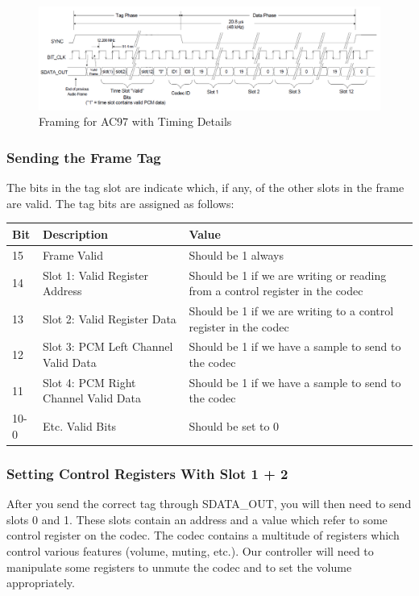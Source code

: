 \documentclass[11pt]{article}
\begin{document}
\begin{figure}[hbt]
	\begin{center}
		\includegraphics[width=6in]{ac97_framing_detail}
		\caption{Framing for AC97 with Timing Details}
	\end{center}
\end{figure}

\subsubsection{Sending the Frame Tag}

The bits in the tag slot are indicate which, if any, of the other slots in the frame are valid. The tag bits are assigned as follows:

\renewcommand{\arraystretch}{1.5}
\begin{center}
	\begin{tabular}{ | l | l | p{8cm} |}
		\hline
		Bit & Description & Value \\ \hline
		15 & Frame Valid & Should be 1 always  \\ \hline
		14 & Slot 1: Valid Register Address & Should be 1 if we are writing or reading from a control register in the codec  \\ \hline
		13 & Slot 2: Valid Register Data & Should be 1 if we are writing to a control register in the codec \\ \hline
		12 & Slot 3: PCM Left Channel Valid Data & Should be 1 if we have a sample to send to the codec  \\ \hline
		11 & Slot 4: PCM Right Channel Valid Data & Should be 1 if we have a sample to send to the codec  \\ \hline
		10-0 & Etc. Valid Bits & Should be set to 0 \\ \hline		
	\end{tabular}
\end{center}

\subsubsection{Setting Control Registers With Slot 1 + 2}
After you send the correct tag through SDATA\_OUT, you will then need to send slots 0 and 1. These slots contain an address and a value which refer to some control register on the codec. The codec contains a multitude of registers which control various features (volume, muting, etc.). Our controller will need to manipulate some registers to unmute the codec and to set the volume appropriately. \\
\end{document}
